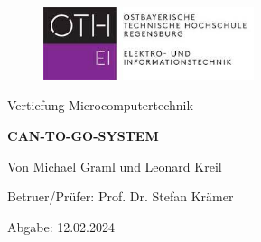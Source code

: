 \begin{figure}[h]
    \centering
    \includegraphics[width = 0.55\textwidth]{img/Image_OTH.jpg}
    \label{fig: OTH Image}
\end{figure}


\begin{center}
    {\Huge {Vertiefung Microcomputertechnik} }
\end{center}

\vspace{2cm}

\noindent\makebox[\linewidth]{\rule{\linewidth}{0.4pt}}
\begin{center}
    {\Huge\textbf{CAN-TO-GO-SYSTEM} }
\end{center}
\noindent\makebox[\linewidth]{\rule{\linewidth}{0.4pt}}

\vspace{2cm}

\begin{center}
    {\Large {Von Michael Graml und Leonard Kreil} }
\end{center}

\vspace{1cm}

\begin{center}
    {\Large {Betruer/Prüfer: Prof. Dr. Stefan Krämer\\

             }}
\end{center}

\vspace{5cm}

\begin{center}
    {\Large Abgabe: 12.02.2024}
\end{center}